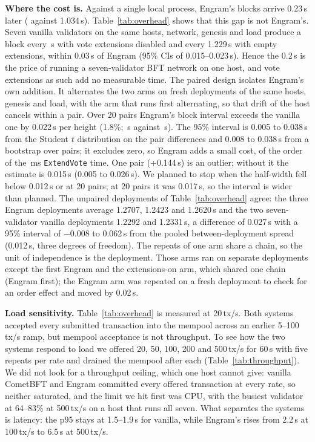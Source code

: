 \textbf{Where the cost is.} Against a single local process, Engram's blocks
arrive 0.23\,s later (\resBlockEngram{} against 1.034\,s). Table~\ref{tab:overhead} shows
that this gap is not Engram's. Seven vanilla validators on the same hosts,
network, genesis and load produce a block every \resBlockVanilla\,s with vote extensions
disabled and every 1.229\,s with empty extensions, within 0.03\,s of Engram
(95\% CIs of 0.015--0.023\,s). Hence the 0.2\,s is the price of running a
seven-validator BFT network on one host, and vote extensions as such add no
measurable time. The paired design isolates Engram's own addition. It alternates the two arms on
fresh deployments of the same hosts, genesis and load, with the arm that runs first
alternating, so that drift of the host cancels within a pair. Over 20 pairs Engram's
block interval exceeds the vanilla one by 0.022\,s per height (1.8\%;
\resPairedEngram\,s against \resPairedVanilla\,s). The 95\% interval is 0.005 to
0.038\,s from the Student $t$ distribution on the pair differences and 0.008 to
0.038\,s from a bootstrap over pairs; it excludes zero, so Engram adds a small cost,
of the order of the \resExtendVoteMs\,ms \texttt{ExtendVote} time. One pair
(+0.144\,s) is an outlier; without it the estimate is 0.015\,s (0.005 to 0.026\,s).
We planned to stop when the half-width fell below 0.012\,s or at 20 pairs; at 20 pairs
it was 0.017\,s, so the interval is wider than planned. The unpaired deployments of
Table~\ref{tab:overhead} agree: the three Engram deployments average 1.2707, 1.2423 and
1.2620\,s and the two seven-validator vanilla deployments 1.2292 and 1.2331\,s, a
difference of 0.027\,s with a 95\% interval of $-$0.008 to 0.062\,s from the pooled
between-deployment spread (0.012\,s, three degrees of freedom). The repeats of one
arm share a chain, so the unit of independence is the deployment. Those arms ran on
separate deployments except the first Engram and the extensions-on arm, which shared
one chain (Engram first); the Engram arm was repeated on a fresh deployment to check
for an order effect and moved by 0.02\,s.


\textbf{Load sensitivity.} Table~\ref{tab:overhead} is measured at 20\,tx/s. Both
systems accepted every submitted transaction into the mempool across an
earlier 5--100\,tx/s ramp, but mempool acceptance is not throughput. To see how
the two systems respond to load we offered 20, 50, 100, 200 and 500\,tx/s for
60\,s with five repeats per rate and drained the mempool after each
(Table~\ref{tab:throughput}). We did not look for a throughput ceiling, which one
host cannot give: vanilla CometBFT and Engram committed every offered
transaction at every rate, so neither saturated, and the limit we hit first was
CPU, with the busiest validator at 64--83\% at 500\,tx/s on a host that runs all
seven. What separates the systems is latency: the p95 stays at 1.5--1.9\,s for
vanilla, while Engram's rises from 2.2\,s at 100\,tx/s to 6.5\,s at 500\,tx/s.

